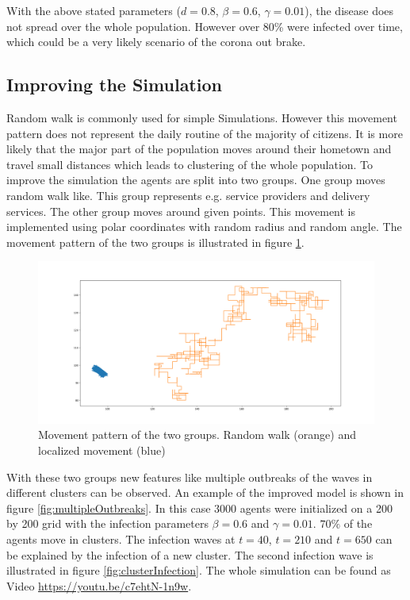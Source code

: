With the above stated parameters ($d=0.8$, $\beta=0.6$, $\gamma=0.01$), the disease does not spread over the whole population. However over 80\% were infected over time, which could be a very likely scenario of the corona out brake.


\subsection{Improving the Simulation}
Random walk is commonly used for simple Simulations. However this movement pattern does not represent the daily routine of the majority of citizens. It  is more likely that the major part of the population moves around their hometown and travel small distances which leads to clustering of the whole population. To improve the simulation the agents are split into two groups. One group moves random walk like. This group represents e.g. service providers and delivery services. The other group moves around given points. This movement is implemented using polar coordinates with random radius and random angle. The movement pattern of the two groups is illustrated in figure \ref{fig:movementPattern}. 
\begin{figure}[H]
	\centering
	\includegraphics[width=0.9\linewidth]{img/movementPattern.png}
	\caption{Movement pattern of the two groups. Random walk (orange) and localized movement (blue)}%
	\label{fig:movementPattern}
\end{figure}

With these two groups new features like multiple outbreaks of the waves in different clusters can be observed. An example of the improved model is shown in figure \ref{fig:multipleOutbreaks}. In this case 3000 agents were initialized on a 200 by 200 grid with the infection parameters $\beta=0.6$ and $\gamma = 0.01$. $70\%$ of the agents move in clusters. The infection waves at $t = 40$, $t = 210$ and $t= 650$ can be explained by the infection of a new cluster. The second infection wave is illustrated in figure \ref{fig:clusterInfection}. The whole simulation can be found  as Video \url{https://youtu.be/c7ehtN-1n9w}.

